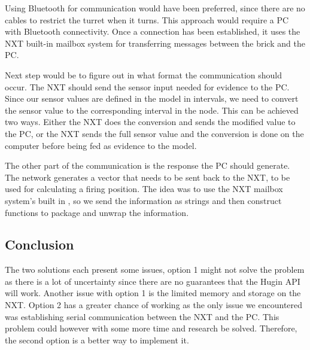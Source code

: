 Using Bluetooth for communication would have been preferred, since there are
no cables to restrict the turret when it turns.
This approach would require a PC with Bluetooth connectivity. Once a connection
has been established, it uses the NXT built-in mailbox system for transferring
messages between the brick and the PC.\nl

Next step would be to figure out in what format the communication should occur.
The NXT should send the sensor input needed for evidence to the PC. Since our
sensor values are defined in the model in intervals, we need to convert the
sensor value to the corresponding interval in the node. This can be achieved two ways. Either
the NXT does the conversion and sends the modified value to the PC, or the NXT
sends the full sensor value and the conversion is done on the computer before
being fed as evidence to the model.\nl

The other part of the communication is the response the PC should generate. The
network generates a vector that needs to be sent back to the NXT, to be used for
calculating a firing position. The idea was to use the NXT mailbox system's
built in , so we send the information as strings and then
construct functions to package and unwrap the information.

\subsection{Conclusion}
The two solutions each present some issues, option 1 might not solve the problem
as there is a lot of uncertainty since there are no guarantees that the Hugin
API will work. Another issue with option 1 is the limited memory and storage on
the NXT. Option 2 has a greater chance of working as the only issue we
encountered was establishing serial communication between the NXT and the PC.
This problem could however with some more time and research be solved.
Therefore, the second option is a better way to implement it. 


